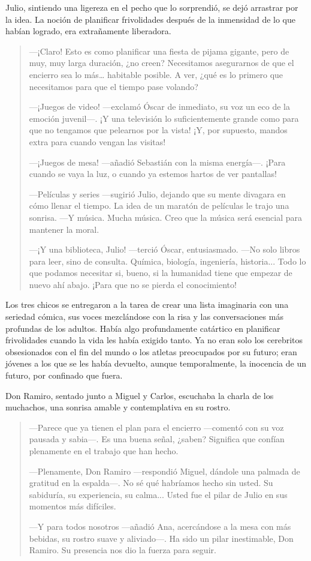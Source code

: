 \documentclass[a4paper,12pt]{book}
\begin{document}
Julio, sintiendo una ligereza en el pecho que lo sorprendió, se dejó arrastrar por la idea. La noción de planificar frivolidades después de la inmensidad de lo que habían logrado, era extrañamente liberadora.
\begin{quote}
    —¡Claro! Esto es como planificar una fiesta de pijama gigante, pero de muy, muy larga duración, ¿no creen? Necesitamos asegurarnos de que el encierro sea lo más… habitable posible. A ver, ¿qué es lo primero que necesitamos para que el tiempo pase volando?

    —¡Juegos de video! —exclamó Óscar de inmediato, su voz un eco de la emoción juvenil—. ¡Y una televisión lo suficientemente grande como para que no tengamos que pelearnos por la vista! ¡Y, por supuesto, mandos extra para cuando vengan las visitas!

    —¡Juegos de mesa! —añadió Sebastián con la misma energía—. ¡Para cuando se vaya la luz, o cuando ya estemos hartos de ver pantallas!

    —Películas y series —sugirió Julio, dejando que su mente divagara en cómo llenar el tiempo. La idea de un maratón de películas le trajo una sonrisa. —Y música. Mucha música. Creo que la música será esencial para mantener la moral.

    —¡Y una biblioteca, Julio! —terció Óscar, entusiasmado. —No solo libros para leer, sino de consulta. Química, biología, ingeniería, historia... Todo lo que podamos necesitar si, bueno, si la humanidad tiene que empezar de nuevo ahí abajo. ¡Para que no se pierda el conocimiento!
\end{quote}

Los tres chicos se entregaron a la tarea de crear una lista imaginaria con una seriedad cómica, sus voces mezclándose con la risa y las conversaciones más profundas de los adultos. Había algo profundamente catártico en planificar frivolidades cuando la vida les había exigido tanto. Ya no eran solo los cerebritos obsesionados con el fin del mundo o los atletas preocupados por su futuro; eran jóvenes a los que se les había devuelto, aunque temporalmente, la inocencia de un futuro, por confinado que fuera.

Don Ramiro, sentado junto a Miguel y Carlos, escuchaba la charla de los muchachos, una sonrisa amable y contemplativa en su rostro.
\begin{quote}
    —Parece que ya tienen el plan para el encierro —comentó con su voz pausada y sabia—. Es una buena señal, ¿saben? Significa que confían plenamente en el trabajo que han hecho.

    —Plenamente, Don Ramiro —respondió Miguel, dándole una palmada de gratitud en la espalda—. No sé qué habríamos hecho sin usted. Su sabiduría, su experiencia, su calma... Usted fue el pilar de Julio en sus momentos más difíciles.

    —Y para todos nosotros —añadió Ana, acercándose a la mesa con más bebidas, su rostro suave y aliviado—. Ha sido un pilar inestimable, Don Ramiro. Su presencia nos dio la fuerza para seguir.
\end{quote}
\end{document}
